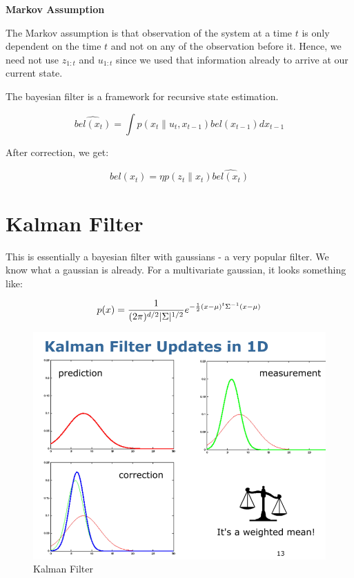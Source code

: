 \textbf{Markov Assumption}

The Markov assumption is that observation of the system at a time $t$ is only dependent on the time $t$ and not on any of the observation before it. Hence, we need not use $z_{1:t}$ and $u_{1:t}$ since we used that information already to arrive at our current state.

The bayesian filter is a framework for recursive state estimation.

\begin{equation}
    \hat{bel(x_t)} = \int p(x_t\|u_t, x_{t-1})bel(x_{t-1})dx_{t-1}
\end{equation}

After correction, we get:

\begin{equation}
    bel(x_t) = \eta p(z_t\|x_t)\hat{bel(x_t)}
\end{equation}

\section{Kalman Filter}

This is essentially a bayesian filter with gaussians - a very popular filter. We know what a gaussian is already. For a multivariate gaussian, it looks something like:

\begin{equation}
    p(x) = \frac{1}{(2\pi)^{d/2}\lvert\Sigma\rvert^{1/2}}e^{-\frac{1}{2}(x-\mu)^t\Sigma^{-1}(x-\mu)}
\end{equation}

\begin{figure}
    \centering
    \includegraphics{img/kalman.png}
    \caption{Kalman Filter}
    \label{fig:kalman}
\end{figure}


